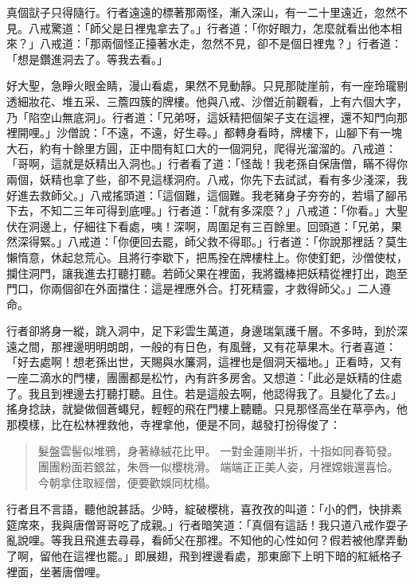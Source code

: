真個獃子只得隨行。行者遠遠的標著那兩怪，漸入深山，有一二十里遠近，忽然不見。八戒驚道：「師父是日裡鬼拿去了。」行者道：「你好眼力，怎麼就看出他本相來？」八戒道：「那兩個怪正擡著水走，忽然不見，卻不是個日裡鬼？」行者道：「想是鑽進洞去了。等我去看。」

好大聖，急睜火眼金睛，漫山看處，果然不見動靜。只見那陡崖前，有一座玲瓏剔透細妝花、堆五采、三簷四簇的牌樓。他與八戒、沙僧近前觀看，上有六個大字，乃「陷空山無底洞」。行者道：「兄弟呀，這妖精把個架子支在這裡，還不知門向那裡開哩。」沙僧說：「不遠，不遠，好生尋。」都轉身看時，牌樓下，山腳下有一塊大石，約有十餘里方圓，正中間有缸口大的一個洞兒，爬得光溜溜的。八戒道：「哥啊，這就是妖精出入洞也。」行者看了道：「怪哉！我老孫自保唐僧，瞞不得你兩個，妖精也拿了些，卻不見這樣洞府。八戒，你先下去試試，看有多少淺深，我好進去救師父。」八戒搖頭道：「這個難，這個難。我老豬身子夯夯的，若塌了腳吊下去，不知二三年可得到底哩。」行者道：「就有多深麼？」八戒道：「你看。」大聖伏在洞邊上，仔細往下看處，咦！深啊，周圍足有三百餘里。回頭道：「兄弟，果然深得緊。」八戒道：「你便回去罷，師父救不得耶。」行者道：「你說那裡話？莫生懶惰意，休起怠荒心。且將行李歇下，把馬拴在牌樓柱上。你使釘鈀，沙僧使杖，攔住洞門，讓我進去打聽打聽。若師父果在裡面，我將鐵棒把妖精從裡打出，跑至門口，你兩個卻在外面擋住：這是裡應外合。打死精靈，才救得師父。」二人遵命。

行者卻將身一縱，跳入洞中，足下彩雲生萬道，身邊瑞氣護千層。不多時，到於深遠之間，那裡邊明明朗朗，一般的有日色，有風聲，又有花草果木。行者喜道：「好去處啊！想老孫出世，天賜與水簾洞，這裡也是個洞天福地。」正看時，又有一座二滴水的門樓，團團都是松竹，內有許多房舍。又想道：「此必是妖精的住處了。我且到裡邊去打聽打聽。且住。若是這般去啊，他認得我了。且變化了去。」搖身捻訣，就變做個蒼蠅兒，輕輕的飛在門樓上聽聽。只見那怪高坐在草亭內，他那模樣，比在松林裡救他，寺裡拿他，便是不同，越發打扮得俊了：
\begin{quote}
髮盤雲髻似堆鴉，身著綠絨花比甲。
一對金蓮剛半折，十指如同春筍發。
團團粉面若銀盆，朱唇一似櫻桃滑。
端端正正美人姿，月裡嫦娥還喜恰。
今朝拿住取經僧，便要歡娛同枕榻。
\end{quote}

行者且不言語，聽他說甚話。少時，綻破櫻桃，喜孜孜的叫道：「小的們，快排素筵席來，我與唐僧哥哥吃了成親。」行者暗笑道：「真個有這話！我只道八戒作耍子亂說哩。等我且飛進去尋尋，看師父在那裡。不知他的心性如何？假若被他摩弄動了啊，留他在這裡也罷。」即展翅，飛到裡邊看處，那東廊下上明下暗的紅紙格子裡面，坐著唐僧哩。

